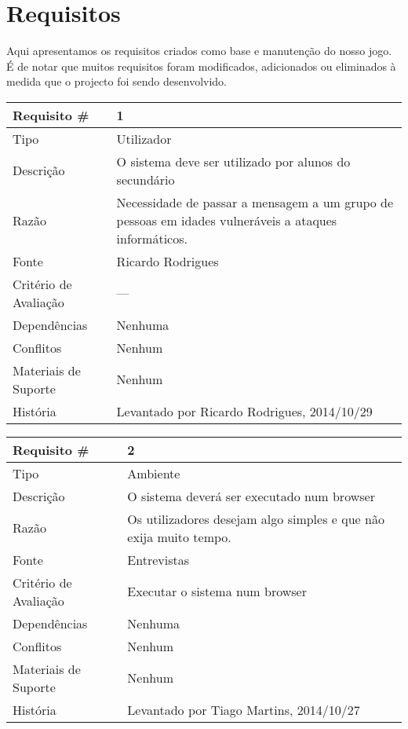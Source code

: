\chapter{Requisitos}
\label{chap:requir} 
Aqui apresentamos os requisitos criados como base e manutenção do nosso jogo.
É de notar que muitos requisitos foram modificados, adicionados ou eliminados à medida que o projecto foi sendo desenvolvido.

\begin{tabular} {|l|p{8cm}|} 
\hline
Requisito \# & 1 \\
\hline
Tipo & Utilizador\\
\hline
Descrição & O sistema deve ser utilizado por alunos do secundário \\
\hline
Razão & Necessidade de passar a mensagem a um grupo de pessoas em idades vulneráveis a ataques informáticos. \\
\hline
Fonte & Ricardo Rodrigues \\
\hline
Critério de Avaliação & --- \\
\hline
Dependências & Nenhuma \\
\hline
Conflitos & Nenhum \\
\hline
Materiais de Suporte & Nenhum \\
\hline
História & Levantado por Ricardo Rodrigues, 2014/10/29 \\
\hline
\end{tabular}

\begin{tabular} {|l|p{8cm}|} 
\hline
Requisito \# & 2 \\
\hline
Tipo & Ambiente \\
\hline
Descrição & O sistema deverá ser executado num browser \\
\hline
Razão & Os utilizadores desejam algo simples e que não exija muito tempo. \\
\hline
Fonte & Entrevistas \\
\hline
Critério de Avaliação & Executar o sistema num browser \\
\hline
Dependências & Nenhuma \\
\hline
Conflitos & Nenhum \\
\hline
Materiais de Suporte & Nenhum \\
\hline
História & Levantado por Tiago Martins, 2014/10/27 \\
\hline
\end{tabular}

